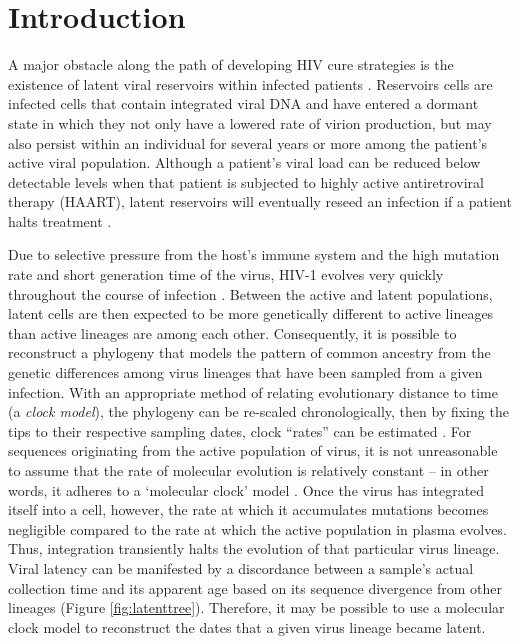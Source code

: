 \section * {Introduction} \label{sec:intro}
A major obstacle along the path of developing HIV cure strategies is the existence of latent viral reservoirs within infected patients \citep{Pace11}. 
Reservoirs cells are infected cells that contain integrated viral DNA and have entered a dormant state in which they not only have a lowered rate of virion production, but may also persist within an individual for several years or more among the patient's active viral population.
Although a patient's viral load can be reduced below detectable levels when that patient is subjected to highly active antiretroviral therapy (HAART), latent reservoirs will eventually reseed an infection if a patient halts treatment \citep{Joos08, Pomerantz03, Richman09}. 


Due to selective pressure from the host's immune system and the high mutation rate and short generation time of the virus, HIV-1 evolves very quickly throughout the course of infection \citep{Alizon13, Shankarappa99, Rambaut04}. 
Between the active and latent populations, latent cells are then expected to be more genetically different to active lineages than active lineages are among each other.
Consequently, it is possible to reconstruct a phylogeny that models the pattern of common ancestry from the genetic differences among virus lineages that have been sampled from a given infection. 
With an appropriate method of relating evolutionary distance to time (a {\em clock model}), the phylogeny can be re-scaled chronologically, then by fixing the tips to their respective sampling dates, clock ``rates'' can be estimated \citep{Rodrigo99}.
For sequences originating from the active population of virus, it is not unreasonable to assume that the rate of molecular evolution is relatively constant -- in other words, it adheres to a `molecular clock' model \citep{Leitner99, Kuhner95, Korber00}. 
Once the virus has integrated itself into a cell, however, the rate at which it accumulates mutations becomes negligible compared to the rate at which the active population in plasma evolves. 
Thus, integration transiently halts the evolution of that particular virus lineage. 
Viral latency can be manifested by a discordance between a sample's actual collection time and its apparent age based on its sequence divergence from other lineages (Figure \ref{fig:latenttree}). 
Therefore, it may be possible to use a molecular clock model to reconstruct the dates that a given virus lineage became latent.

